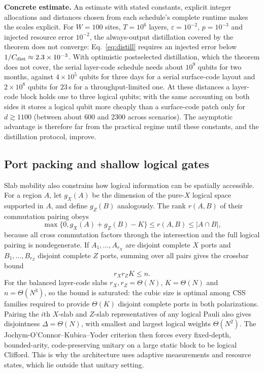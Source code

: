 \documentclass[10pt,a4paper,twocolumn]{article}
\begin{document}
\textbf{Concrete estimate.}  An estimate with stated constants, explicit integer
allocations and distances chosen from each schedule's complete runtime makes the
scales explicit.  For $W=100$ sites, $T=10^6$ layers, $\varepsilon=10^{-2}$,
$p=10^{-3}$ and injected resource error $10^{-2}$, the always-output
distillation covered by the theorem does not converge: Eq.~\eqref{eq:distill}
requires an injected error below $1/C_{\rm dist}\approx2.3\times10^{-3}$.  With
optimistic postselected distillation, which the theorem does not cover, the
serial layer-code schedule needs about $10^9$ qubits for two months, against
$4\times10^5$ qubits for three days for a serial surface-code layout and
$2\times10^8$ qubits for $23$\,s for a throughput-limited one.  At these
distances a layer-code block holds one to three logical qubits; with the same
accounting on both sides it stores a logical qubit more cheaply than a
surface-code patch only for $d\gtrsim1100$ (between about $600$ and $2300$
across scenarios).  The asymptotic advantage is therefore far from the
practical regime until these constants, and the distillation protocol, improve.

\subsection{Port packing and shallow logical gates}
\label{sec:structure}
Slab mobility also constrains how logical information can be spatially
accessible.  For a region $A$, let $g_X(A)$ be the dimension of the pure-$X$
logical space supported in $A$, and define $g_Z(B)$ analogously.  The rank
$r(A,B)$ of their commutation pairing obeys
\begin{equation}
 \max\{0,g_X(A)+g_Z(B)-K\}\le r(A,B)\le |A\cap B|,
 \label{eq:overlap}
\end{equation}
because all cross commutation factors through the intersection and the full
logical pairing is nondegenerate.  If $A_1,\ldots,A_{r_X}$ are disjoint complete
$X$ ports and $B_1,\ldots,B_{r_Z}$ disjoint complete $Z$ ports, summing over all
pairs gives the crossbar bound
\begin{equation}
 r_Xr_ZK\le n.
 \label{eq:crossbar}
\end{equation}
For the balanced layer-code slabs $r_X,r_Z=\Theta(N)$, $K=\Theta(N)$ and
$n=\Theta(N^3)$, so the bound is saturated: the cubic size is optimal among CSS
families required to provide $\Theta(K)$ disjoint complete ports in both
polarizations.  Pairing the $i$th $X$-slab and $Z$-slab representatives of any
logical Pauli also gives disjointness $\Delta=\Theta(N)$, with smallest and
largest logical weights $\Theta(N^2)$.  The Jochym-O'Connor--Kubica--Yoder
criterion \cite{JochymDisjointness} then forces every fixed-depth,
bounded-arity, code-preserving unitary on a large static block to be logical
Clifford.  This is why the architecture uses adaptive measurements and resource
states, which lie outside that unitary setting.
\end{document}

